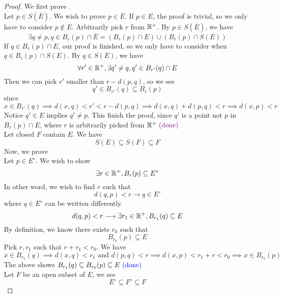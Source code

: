 \documentclass{report}
\begin{document}
\begin{proof}
  We first prove .\\


Let $p\in S(\overline{E})$. We wish to prove $p\in \overline{E}$. If $p\in  E$, the proof is trivial, so we only have to consider $p\not\in E$. Arbitrarily pick $r$ from $\mathbb{R}^+$. By $p\in  S(\overline{E})$, we have
\begin{equation}
\exists q\neq p, q\in B_r(p)\cap \overline{E}=(B_r(p)\cap E)\cup (B_r(p)\cap S(E))
\end{equation}
If $q \in B_r(p)\cap E$, our proof is finished, so we only have to consider when $q\in B_r(p)\cap S(E)$. By $q\in S(E)$, we have
\begin{equation}
\forall r'\in\mathbb{R}^+, \exists q'\neq q, q'\in B_{r'}(q)\cap E
\end{equation}
Then we can pick $r'$ smaller than  $r-d(p,q)$, so we see 
 \begin{equation}
q'\in B_{r'}(q)\subseteq B_r(p)
\end{equation}
since
\begin{equation}
x\in B_{r'}(q)\implies d(x,q)<r'<r-d(p,q)\implies d(x,q)+d(p,q)<r\implies d(x,p)<r
\end{equation}
Notice $q'\in E$ implies $q'\neq p$. This finish the proof, since $q'$ is a point not $p$ in  $B_r(p)\cap E$, where $r$ is arbitrarily picked from $\mathbb{R}^+\textcolor{violet}{\text{ (done) }}$\\

Let closed $F$ contain $E$. We have 
\begin{equation}
S(E)\subseteq S(F)\subseteq F
\end{equation}
Now, we prove  \\

Let $p\in  E^\circ $. We wish to show 
\begin{equation}
\exists r\in\mathbb{R}^+, B_r(p)\subseteq E^\circ 
\end{equation}
In other word, we wish to find $r$ such that
\begin{equation}
d(q,p)<r\longrightarrow q\in E^\circ 
\end{equation}
where $q\in E^\circ $ can be written differently.  \begin{equation}
d(q,p)<r\longrightarrow \exists r_1\in\mathbb{R}^+, B_{r_1}(q)\subseteq E
\end{equation}
By definition, we know there exists $r_0$ such that
 \begin{equation}
B_{r_0}(p)\subseteq E
\end{equation}
Pick $r,r_1$ such that  $r+r_1<r_0$. We have
 \begin{equation}
x\in B_{r_1}(q)\implies d(x,q)<r_1\text{ and }d(p,q)<r\implies d(x,p)<r_1+r<r_0\implies x\in B_{r_0}(p)
\end{equation}
The above shows $B_{r_1}(q)\subseteq B_{r_0}(p)\subseteq E\textcolor{blue}{\text{ (done) }}$\\

Let $F$ be an open subset of  $E$, we see
 \begin{equation}
E^\circ \subseteq F^\circ \subseteq F
\end{equation}
\end{proof}
\end{document}
